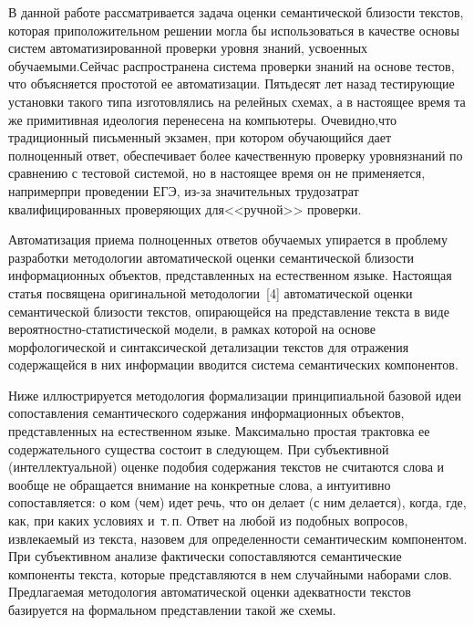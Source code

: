 \begin{multicols}{2}
     В данной работе рассматривается задача оценки семантической близости 
текстов, которая при\linebreak положительном решении могла бы использоваться в качестве 
основы систем автоматизированной проверки уровня знаний, усвоенных 
обучаемыми.\linebreak Сейчас распространена система проверки знаний на основе тестов, что 
объясняется простотой ее автоматизации. Пятьдесят лет назад тестирующие\linebreak 
установки такого типа изготовлялись на релейных схемах, а в настоящее время та 
же примитивная идеология перенесена на компьютеры. Очевидно,\linebreak что 
традиционный письменный экзамен, при котором обучающийся дает полноценный 
ответ, обеспечивает более качественную проверку уровня\linebreak знаний по сравнению с 
тестовой системой, но в настоящее время он не применяется, например\linebreak при 
проведении ЕГЭ, из-за значительных трудо\-затрат квалифицированных 
проверяющих для\linebreak <<ручной>> проверки. 
     
      Автоматизация приема полноценных ответов обучаемых упирается в 
проблему разработки методологии автоматической оценки семантической близости 
информационных объектов, представленных на естественном языке. Настоящая 
статья посвящена оригинальной методологии~[4] автоматической оценки 
семантической близости текстов, опирающейся на представление текста в виде 
     ве\-ро\-ят\-но\-ст\-но-ста\-ти\-сти\-че\-ской модели, в рамках которой на основе 
морфологической и синтаксической детализации текстов для отражения 
содержащейся в них информации вводится система семантических компонентов. 
     
     Ниже иллюстрируется методология формализации принципиальной базовой 
идеи сопоставления семантического содержания информационных объектов, 
представленных на естественном языке. Максимально простая трактовка ее 
содержательного существа состоит в следующем. При субъективной 
(интеллектуальной) оценке подобия содержания текстов не считаются слова и 
вообще не обращается внимание на конкретные слова, а интуитивно сопоставляется: 
о ком (чем) идет речь, что он делает (с ним делается), когда, где, как, при каких 
условиях и~т.\,п. Ответ на любой из подобных вопросов, извлекаемый из текста, 
назовем для определенности семантическим компонентом. При субъективном 
анализе фактически со\-по\-став\-ля\-ют\-ся семантические компоненты текста, которые 
представляются в нем случайными наборами слов. Предлагаемая методология 
автоматической оценки адекватности текстов базируется на формальном 
представлении такой же схемы.
     

\end{multicols}
